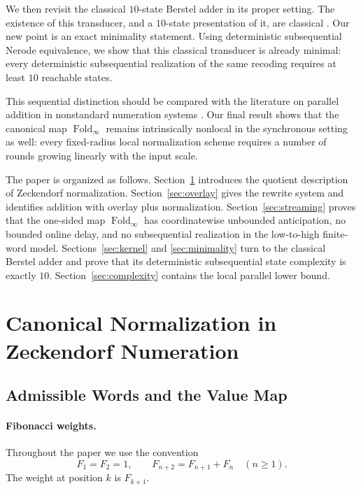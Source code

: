 \documentclass[11pt,letterpaper]{article}
\numberwithin{equation}{section}
\theoremstyle{plain}
\theoremstyle{definition}
\theoremstyle{remark}
\DeclareMathOperator{\Fold}{Fold}
\begin{document}
We then revisit the classical $10$-state Berstel adder in its proper setting.
The existence of this transducer, and a $10$-state presentation of it, are
classical
\cite{Frougny1999OnlineAddition,LabbeLepsova2023FibonacciTwosComplement}.  Our
new point is an exact minimality statement.  Using deterministic
subsequential Nerode equivalence, we show that this classical transducer is
already minimal: every deterministic subsequential realization of the same
recoding requires at least $10$ reachable states.

This sequential distinction should be compared with the literature on parallel
addition in nonstandard numeration systems
\cite{FrougnyPelantovaSvobodova2013MinimalDigitSets}.  Our final result shows
that the canonical map $\Fold_\infty$ remains intrinsically nonlocal in the
synchronous setting as well: every fixed-radius local normalization scheme
requires a number of rounds growing linearly with the input scale.

The paper is organized as follows.  Section~\ref{sec:preliminaries} introduces
the quotient description of Zeckendorf normalization.  Section~\ref{sec:overlay}
gives the rewrite system and identifies addition with overlay plus
normalization.  Section~\ref{sec:streaming} proves that the one-sided map
$\Fold_\infty$ has coordinatewise unbounded anticipation, no bounded online
delay, and no subsequential realization in the low-to-high finite-word model.
Sections~\ref{sec:kernel} and \ref{sec:minimality} turn to the classical
Berstel adder and prove that its deterministic subsequential state complexity
is exactly $10$.  Section~\ref{sec:complexity} contains the local parallel
lower bound.

\section{Canonical Normalization in Zeckendorf Numeration}\label{sec:preliminaries}

\subsection{Admissible Words and the Value Map}

\paragraph{Fibonacci weights.}
Throughout the paper we use the convention
\[
F_1=F_2=1,\qquad F_{n+2}=F_{n+1}+F_n\quad (n\ge 1).
\]
The weight at position $k$ is $F_{k+1}$.
\end{document}
